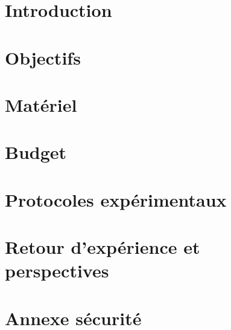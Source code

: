 \documentclass{article}
\begin{document}


\tableofcontents

\newpage

\section{{Introduction}}


\section{{Objectifs}}


\section{{Matériel}}


\section{{Budget}}


\section{{Protocoles expérimentaux}}


\section{{Retour d'expérience et perspectives}}


\newpage

\appendix

\section{{Annexe sécurité}}


\newpage



\end{document}
